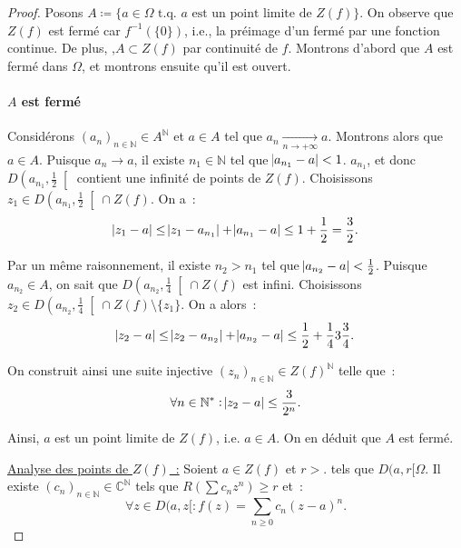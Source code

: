 \documentclass{report}
\theoremstyle{definition}
\theoremstyle{remark}
\numberwithin{equation}{section}
\newcommand{\C}{\mathbb C}
\newcommand{\N}{\mathbb N}
\newcommand{\tq}{\text{ t.q. }}
\newcommand{\pinfty}{{+\infty}}
\begin{document}
			\begin{proof} Posons $A \coloneqq \{a \in \Omega \tq a \text{ est un point limite de } Z(f)\}$. On observe que $Z(f)$ est fermé car $f^{-1}(\{0\})$, i.e.,
			la préimage d'un fermé par une fonction continue. De plus, ,$A \subset Z(f)$ par continuité de $f$. Montrons d'abord que $A$ est fermé dans $\Omega$, et
			montrons ensuite qu'il est ouvert.

			\paragraph{$A$ est fermé} Considérons $(a_n)_{n \in \N} \in A^\N$ et $a \in A$ tel que $a_n \xrightarrow[n \to \pinfty]{} a$. Montrons alors que $a \in A$.
			Puisque $a_n \to a$, il existe $n_1 \in \N$ tel que $\abs {a_{n_1} - a} < 1$. $a_{n_1}$, et donc $D\left(a_{n_1}, \frac 12\right[$ contient une infinité de
			points de $Z(f)$. Choisissons $z_1 \in D\left(a_{n_1}, \frac 12\right[ \cap Z(f)$. On a~:
			\begin{equation}
				\abs {z_1 - a} \leq \abs {z_1 - a_{n_1}} + \abs {a_{n_1} - a} \leq 1 + \frac 12 = \frac 32.
			\end{equation}

			Par un même raisonnement, il existe $n_2 > n_1$ tel que $\abs {a_{n_2} - a} < \frac 12$. Puisque $a_{n_2} \in A$, on sait que $D\left(a_{n_2}, \frac 14\right[ \cap Z(f)$
			est infini. Choisissons $z_2 \in D\left(a_{n_2}, \frac 14\right[ \cap Z(f) \setminus \{z_1\}$. On a alors~:
			\begin{equation}
				\abs {z_2 - a} \leq \abs {z_2 - a_{n_2}} + \abs {a_{n_2} - a} \leq \frac 12 + \frac 14 3 \frac 34.
			\end{equation}

			On construit ainsi une suite injective $(z_n)_{n \in \N} \in Z(f)^\N$ telle que~:
			\begin{equation}
				\forall n \in \N^* : \abs {z_2 - a} \leq \frac 3{2^n}.
			\end{equation}

			Ainsi, $a$ est un point limite de $Z(f)$, i.e. $a \in A$. On en déduit que $A$ est fermé.

			\underline{Analyse des points de $Z(f)$~:} Soient $a \in Z(f)$ et $r > .$ tels que $D(a, r[ \Omega$. Il existe $(c_n)_{n \in \N} \in \C^\N$ tels que
			$R(\sum c_nz^n) \geq r$ et~:
			\begin{equation}
				\forall z \in D(a, z[ : f(z) = \sum_{n \geq 0}c_n(z-a)^n.
			\end{equation}


\end{proof}
\end{document}
